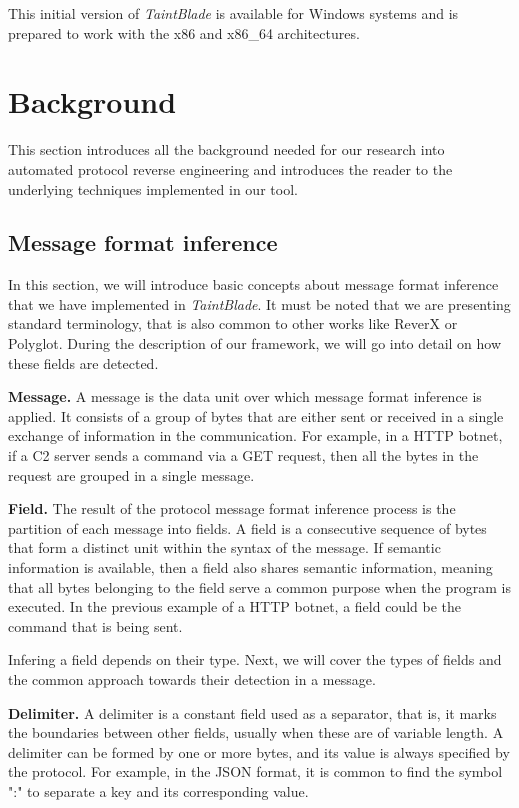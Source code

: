 \documentclass[conference]{IEEEtran}
\begin{document}
This initial version of \textit{TaintBlade} is available for Windows systems
and is prepared to work with the x86 and x86\_64 architectures.

\section{Background}
This section introduces all the background needed for our research into
automated protocol reverse engineering and introduces the reader to the
underlying techniques implemented in our tool.

\subsection{Message format inference}\label{subsec:msg_format_inference}
In this section, we will introduce basic concepts about message format
inference that we have implemented in \textit{TaintBlade}. It must be noted
that we are presenting standard terminology, that is also common to other works
like ReverX\cite{github_pre_reverx} or Polyglot\cite{polyglot_caballero}.
During the description of our framework, we will go into detail on how these
fields are detected.

\textbf{Message.} A message is the data unit over which message format inference is applied. It
consists of a group of bytes that are either sent or received in a single exchange of information
in the communication. For example, in a HTTP botnet, if a C2 server sends a command via a GET request,
then all the bytes in the request are grouped in a single message.

\textbf{Field.} The result of the protocol message format inference process is the partition of each
message into fields. A field is a consecutive sequence of bytes that form a distinct unit within the syntax of the message.
If semantic information is available, then a field also shares semantic information, meaning that all bytes
belonging to the field serve a common purpose when the program is executed. In the previous example of a HTTP botnet,
a field could be the command that is being sent.

Infering a field depends on their type. Next, we will cover the types of fields
and the common approach towards their detection in a message.

\textbf{Delimiter.} A delimiter is a constant field used as a separator,
that is, it marks the boundaries between other fields, usually when these
are of variable length. A delimiter can be formed by one or more bytes,
and its value is always specified by the protocol.
For example, in the JSON format, it is common to find the symbol ":" to
separate a key and its corresponding value.
\end{document}
